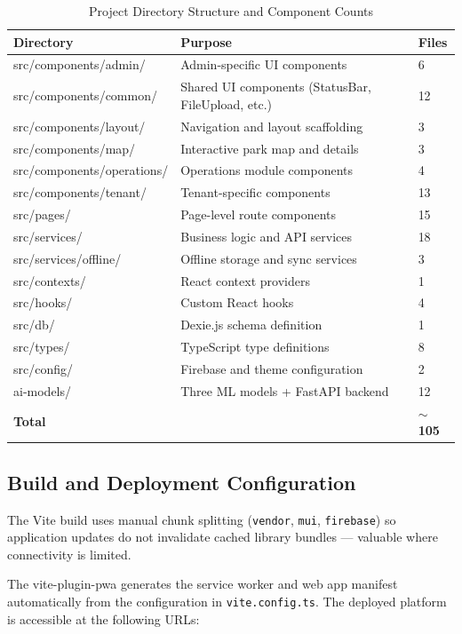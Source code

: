 \begin{table}[H]
\centering
\caption{Project Directory Structure and Component Counts}
\label{tab:project-structure}
\small
\begin{tabular}{p{3.8cm}p{7.5cm}l}
\toprule
\textbf{Directory} & \textbf{Purpose} & \textbf{Files} \\
\midrule
src/components/admin/ & Admin-specific UI components & 6 \\
src/components/common/ & Shared UI components (StatusBar, FileUpload, etc.) & 12 \\
src/components/layout/ & Navigation and layout scaffolding & 3 \\
src/components/map/ & Interactive park map and details & 3 \\
src/components/operations/ & Operations module components & 4 \\
src/components/tenant/ & Tenant-specific components & 13 \\
src/pages/ & Page-level route components & 15 \\
src/services/ & Business logic and API services & 18 \\
src/services/offline/ & Offline storage and sync services & 3 \\
src/contexts/ & React context providers & 1 \\
src/hooks/ & Custom React hooks & 4 \\
src/db/ & Dexie.js schema definition & 1 \\
src/types/ & TypeScript type definitions & 8 \\
src/config/ & Firebase and theme configuration & 2 \\
ai-models/ & Three ML models + FastAPI backend & 12 \\
\midrule
\textbf{Total} & & \textbf{$\sim$105} \\
\bottomrule
\end{tabular}
\end{table}

\subsection{Build and Deployment Configuration}

The Vite build uses manual chunk splitting (\texttt{vendor}, \texttt{mui}, \texttt{firebase}) so application updates do not invalidate cached library bundles --- valuable where connectivity is limited.

The vite-plugin-pwa generates the service worker and web app manifest automatically from the configuration in \texttt{vite.config.ts}. The deployed platform is accessible at the following URLs:

